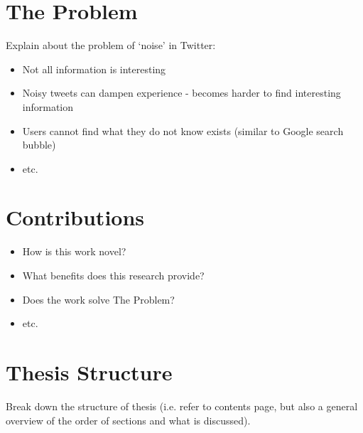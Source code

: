 \section{The Problem}
Explain about the problem of `noise' in Twitter:
\begin{itemize}
\item Not all information is interesting
\item Noisy tweets can dampen experience - becomes harder to find interesting information
\item Users cannot find what they do not know exists (similar to Google search bubble)
\item etc.
\end{itemize}

\section{Contributions}
\begin{itemize}
\item How is this work novel?
\item What benefits does this research provide?
\item Does the work solve The Problem? 
\item etc.
\end{itemize}
\section{Thesis Structure}
Break down the structure of thesis (i.e. refer to contents page, but also a general overview of the order of sections and what is discussed).

